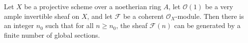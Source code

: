 Let $X$ be a projective scheme over a noetherian ring $A$, let $\mathcal{O}(1)$ be a very ample invertible sheaf on $X$, and let $\mathcal{F}$ be a coherent $\mathcal{O}_X$-module. Then there is an integer $n_0$ such that for all $n \geqslant n_0$, the sheaf $\mathcal{F}(n)$ can be generated by a finite number of global sections.

